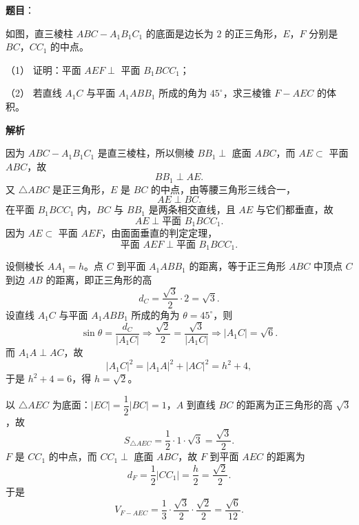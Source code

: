 \begin{answer}

\textbf{题目}：

如图，直三棱柱 \(ABC-A_1B_1C_1\) 的底面是边长为 \(2\) 的正三角形，\(E\)，\(F\) 分别是 \(BC\)，\(CC_1\) 的中点。

（1） 证明：平面 \(AEF\perp\) 平面 \(B_1BCC_1\)；

（2） 若直线 \(A_1C\) 与平面 \(A_1ABB_1\) 所成的角为 \(45^\circ\)，求三棱锥 \(F-AEC\) 的体积。
\nopagebreak[4]
\begin{center}\end{center}
\nopagebreak[4]
\enlargethispage{2\baselineskip}

\textbf{解析}


因为 \(ABC-A_1B_1C_1\) 是直三棱柱，所以侧棱 \(BB_1\perp\) 底面 \(ABC\)，而 \(AE\subset\) 平面 \(ABC\)，故
\nopagebreak[4]
\[
BB_1\perp AE.
\]
又 \(\triangle ABC\) 是正三角形，\(E\) 是 \(BC\) 的中点，由等腰三角形三线合一，
\nopagebreak[4]
\[
AE\perp BC.
\]
在平面 \(B_1BCC_1\) 内，\(BC\) 与 \(BB_1\) 是两条相交直线，且 \(AE\) 与它们都垂直，故
\nopagebreak[4]
\[
AE\perp\text{平面 }B_1BCC_1.
\]
因为 \(AE\subset\) 平面 \(AEF\)，由面面垂直的判定定理，
\nopagebreak[4]
\[
\text{平面 }AEF\perp\text{平面 }B_1BCC_1.
\]


设侧棱长 \(AA_1=h\)。点 \(C\) 到平面 \(A_1ABB_1\) 的距离，等于正三角形 \(ABC\) 中顶点 \(C\) 到边 \(AB\) 的距离，即正三角形的高
\nopagebreak[4]
\[
d_C=\dfrac{\sqrt3}{2}\cdot2=\sqrt3.
\]
设直线 \(A_1C\) 与平面 \(A_1ABB_1\) 所成的角为 \(\theta=45^\circ\)，则
\nopagebreak[4]
\[
\sin\theta=\dfrac{d_C}{|A_1C|}
\Longrightarrow \dfrac{\sqrt2}{2}=\dfrac{\sqrt3}{|A_1C|}
\Longrightarrow |A_1C|=\sqrt6.
\]
而 \(A_1A\perp AC\)，故
\nopagebreak[4]
\[
|A_1C|^2=|A_1A|^2+|AC|^2=h^2+4,
\]
于是 \(h^2+4=6\)，得 \(h=\sqrt2\)。

以 \(\triangle AEC\) 为底面：\(|EC|=\dfrac12|BC|=1\)，\(A\) 到直线 \(BC\) 的距离为正三角形的高 \(\sqrt3\)，故
\nopagebreak[4]
\[
S_{\triangle AEC}=\dfrac12\cdot1\cdot\sqrt3=\dfrac{\sqrt3}{2}.
\]
\(F\) 是 \(CC_1\) 的中点，而 \(CC_1\perp\) 底面 \(ABC\)，故 \(F\) 到平面 \(AEC\) 的距离为
\nopagebreak[4]
\[
d_F=\dfrac12|CC_1|=\dfrac h2=\dfrac{\sqrt2}{2}.
\]
于是
\nopagebreak[4]
\[
V_{F-AEC}=\dfrac13\cdot\dfrac{\sqrt3}{2}\cdot\dfrac{\sqrt2}{2}=\dfrac{\sqrt6}{12}.
\]


\end{answer}
